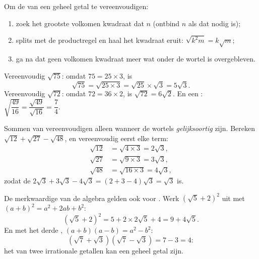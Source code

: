 \begin{method}\label{met:g9:sqrt:simplify}
Om de  van een geheel getal te vereenvoudigen:
\begin{enumerate}
  \item zoek het grootste volkomen kwadraat dat $n$  (ontbind $n$ als dat
        nodig is);
  \item splits met de productregel en haal het kwadraat eruit:
        $\sqrt{k^2 m} = k\sqrt m$;
  \item ga na dat geen volkomen kwadraat meer  wat onder de wortel is
        overgebleven.
\end{enumerate}
\end{method}

\begin{example}\label{ex:g9:sqrt:simplify}
Vereenvoudig $\sqrt{75}$: omdat $75 = 25 \times 3$, is
\[
\sqrt{75} = \sqrt{25 \times 3} = \sqrt{25} \times \sqrt 3 = 5\sqrt3 .
\]
Vereenvoudig $\sqrt{72}$: omdat $72 = 36 \times 2$, is $\sqrt{72} = 6\sqrt2$. En
een : $\sqrt{\dfrac{49}{16}} = \dfrac{\sqrt{49}}{\sqrt{16}} =
\dfrac74$.
\end{example}

\begin{example}\label{ex:g9:sqrt:add}
Sommen van  vereenvoudigen alleen wanneer de wortels
\emph{gelijksoortig} zijn. Bereken $\sqrt{12} + \sqrt{27} - \sqrt{48}$, en
vereenvoudig eerst elke term:
\begin{align*}
\sqrt{12} &= \sqrt{4 \times 3} = 2\sqrt3, \\
\sqrt{27} &= \sqrt{9 \times 3} = 3\sqrt3, \\
\sqrt{48} &= \sqrt{16 \times 3} = 4\sqrt3,
\end{align*}
zodat de  $2\sqrt3 + 3\sqrt3 - 4\sqrt3 = (2 + 3 - 4)\sqrt3 = \sqrt3$ is.
\end{example}

\begin{example}\label{ex:g9:sqrt:expand}
De merkwaardige  van de algebra gelden ook voor . Werk
$\left(\sqrt5 + 2\right)^2$ uit met $(a+b)^2 = a^2 + 2ab + b^2$:
\[
\left(\sqrt5 + 2\right)^2 = 5 + 2 \times 2\sqrt5 + 4 = 9 + 4\sqrt5 .
\]
En met het derde , $(a+b)(a-b) = a^2 - b^2$:
\[
\left(\sqrt7 + \sqrt3\right)\left(\sqrt7 - \sqrt3\right) = 7 - 3 = 4 :
\]
het  van twee irrationale getallen kan een geheel getal zijn.
\end{example}

